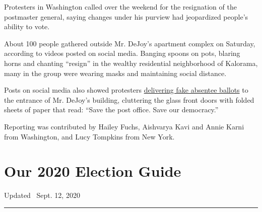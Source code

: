 Protesters in Washington called over the weekend for the resignation of
the postmaster general, saying changes under his purview had jeopardized
people's ability to vote.

About 100 people gathered outside Mr. DeJoy's apartment complex on
Saturday, according to videos posted on social media. Banging spoons on
pots, blaring horns and chanting ``resign'' in the wealthy residential
neighborhood of Kalorama, many in the group were wearing masks and
maintaining social distance.

Posts on social media also showed protesters
\href{https://www.shutdowndc.org/post/shut-down-dc-delivers-democracy-to-postmaster-general-louis-dejoy}{delivering
fake absentee ballots} to the entrance of Mr. DeJoy's building,
cluttering the glass front doors with folded sheets of paper that read:
``Save the post office. Save our democracy.''

Reporting was contributed by Hailey Fuchs, Aishvarya Kavi and Annie
Karni from Washington, and Lucy Tompkins from New York.

\hypertarget{our-2020-election-guide}{%
\section{Our 2020 Election Guide}\label{our-2020-election-guide}}

Updated ~Sept. 12, 2020

\begin{center}\rule{0.5\linewidth}{\linethickness}\end{center}


